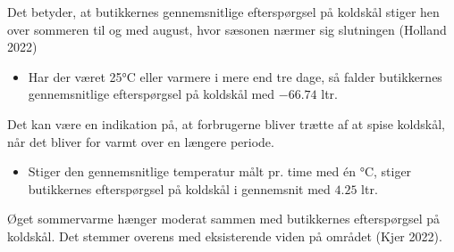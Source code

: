 \documentclass[
  12pt,
  a4paper,
  DIV=11,
  numbers=noendperiod]{scrartcl}
\providecommand{\tightlist}{%
  \setlength{\itemsep}{0pt}\setlength{\parskip}{0pt}}\usepackage{longtable,booktabs,array}
\begin{document}
Det betyder, at butikkernes gennemsnitlige efterspørgsel på koldskål
stiger hen over sommeren til og med august, hvor sæsonen nærmer sig
slutningen (Holland 2022)

\begin{itemize}
\tightlist
\item
  Har der været 25°C eller varmere i mere end tre dage, så falder
  butikkernes gennemsnitlige efterspørgsel på koldskål med \(-66.74\)
  ltr.
\end{itemize}

Det kan være en indikation på, at forbrugerne bliver trætte af at spise
koldskål, når det bliver for varmt over en længere periode.

\begin{itemize}
\tightlist
\item
  Stiger den gennemsnitlige temperatur målt pr. time med én °C, stiger
  butikkernes efterspørgsel på koldskål i gennemsnit med \(4.25\) ltr.
\end{itemize}

Øget sommervarme hænger moderat sammen med butikkernes efterspørgsel på
koldskål. Det stemmer overens med eksisterende viden på området (Kjer
2022).
\end{document}
